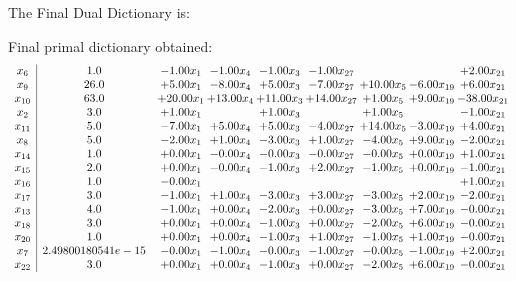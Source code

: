 \documentclass[8pt]{article}
\begin{document}
The Final Dual Dictionary is: 

 Final primal dictionary obtained: 
\[\begin{array}{c| c c@{\hskip 2pt} c@{\hskip 2pt} c@{\hskip 2pt} c@{\hskip 2pt} c@{\hskip 2pt} c@{\hskip 2pt} c@{\hskip 2pt} }
 x_{6}   &  1.0 & -1.00 x_{1} & -1.00 x_{4} & -1.00 x_{3} & -1.00 x_{27} &    &   & +  2.00 x_{21}\\
 x_{9}   &  26.0 & +  5.00 x_{1} & -8.00 x_{4} & +  5.00 x_{3} & -7.00 x_{27} & + 10.00 x_{5} & -6.00 x_{19} & +  6.00 x_{21}\\
 x_{10}   &  63.0 & + 20.00 x_{1} & + 13.00 x_{4} & + 11.00 x_{3} & + 14.00 x_{27} & +  1.00 x_{5} & +  9.00 x_{19} & -38.00 x_{21}\\
 x_{2}   &  3.0 & +  1.00 x_{1} &   & +  1.00 x_{3} &   & +  1.00 x_{5} &   & -1.00 x_{21}\\
 x_{11}   &  5.0 & -7.00 x_{1} & +  5.00 x_{4} & +  5.00 x_{3} & -4.00 x_{27} & + 14.00 x_{5} & -3.00 x_{19} & +  4.00 x_{21}\\
 x_{8}   &  5.0 & -2.00 x_{1} & +  1.00 x_{4} & -3.00 x_{3} & +  1.00 x_{27} & -4.00 x_{5} & +  9.00 x_{19} & -2.00 x_{21}\\
 x_{14}   &  1.0 & +  0.00 x_{1} & -0.00 x_{4} & -0.00 x_{3} & -0.00 x_{27} & -0.00 x_{5} & +  0.00 x_{19} & +  1.00 x_{21}\\
 x_{15}   &  2.0 & +  0.00 x_{1} & -0.00 x_{4} & -1.00 x_{3} & +  2.00 x_{27} & -1.00 x_{5} & +  0.00 x_{19} & -1.00 x_{21}\\
 x_{16}   &  1.0 & -0.00 x_{1} &    &    &    &    &   & +  1.00 x_{21}\\
 x_{17}   &  3.0 & -1.00 x_{1} & +  1.00 x_{4} & -3.00 x_{3} & +  3.00 x_{27} & -3.00 x_{5} & +  2.00 x_{19} & -2.00 x_{21}\\
 x_{13}   &  4.0 & -1.00 x_{1} & +  0.00 x_{4} & -2.00 x_{3} & +  0.00 x_{27} & -3.00 x_{5} & +  7.00 x_{19} & -0.00 x_{21}\\
 x_{18}   &  3.0 & +  0.00 x_{1} & +  0.00 x_{4} & -1.00 x_{3} & +  0.00 x_{27} & -2.00 x_{5} & +  6.00 x_{19} & -0.00 x_{21}\\
 x_{20}   &  1.0 & +  0.00 x_{1} & +  0.00 x_{4} & -1.00 x_{3} & +  1.00 x_{27} & -1.00 x_{5} & +  1.00 x_{19} & -0.00 x_{21}\\
 x_{7}   &  2.49800180541e-15 & -0.00 x_{1} & -1.00 x_{4} & -0.00 x_{3} & -1.00 x_{27} & -0.00 x_{5} & -1.00 x_{19} & +  2.00 x_{21}\\
 x_{22}   &  3.0 & +  0.00 x_{1} & +  0.00 x_{4} & -1.00 x_{3} & +  0.00 x_{27} & -2.00 x_{5} & +  6.00 x_{19} & -0.00 x_{21}\\

\end{array}\]
\end{document}
